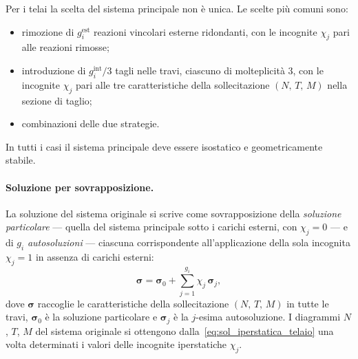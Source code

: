\begin{oss}
	Per i telai la scelta del sistema principale 
	non è unica. Le scelte più comuni sono:
	\begin{itemize}[noitemsep]
		\item rimozione di $g_i^{\text{est}}$ 
		reazioni vincolari esterne ridondanti, 
		con le incognite $\chi_j$ pari alle 
		reazioni rimosse;
		\item introduzione di $g_i^{\text{int}}/3$ 
		tagli nelle travi, ciascuno di molteplicità 
		$3$, con le incognite $\chi_j$ pari alle 
		tre caratteristiche della sollecitazione 
		$(N,\, T,\, M)$ nella sezione di taglio;
		\item combinazioni delle due strategie.
	\end{itemize}
	In tutti i casi il sistema principale deve 
	essere isostatico e geometricamente stabile.
\end{oss}

\paragraph{Soluzione per sovrapposizione.}
La soluzione del sistema originale si scrive come 
sovrapposizione della \emph{soluzione particolare} 
--- quella del sistema principale sotto i carichi 
esterni, con $\chi_j = 0$ --- e di $g_i$ 
\emph{autosoluzioni} --- ciascuna corrispondente 
all'applicazione della sola incognita $\chi_j = 1$ 
in assenza di carichi esterni:
\begin{equation}\label{eq:sol_iperstatica_telaio}
	\bm{\sigma} = \bm{\sigma}_0 + 
	\sum_{j=1}^{g_i} \chi_j\, \bm{\sigma}_j,
\end{equation}
dove $\bm{\sigma}$ raccoglie le caratteristiche 
della sollecitazione $(N,\, T,\, M)$ in tutte le 
travi, $\bm{\sigma}_0$ è la soluzione particolare 
e $\bm{\sigma}_j$ è la $j$-esima autosoluzione.
I diagrammi $N$, $T$, $M$ del sistema originale 
si ottengono dalla~\eqref{eq:sol_iperstatica_telaio} 
una volta determinati i valori delle incognite 
iperstatiche $\chi_j$.

